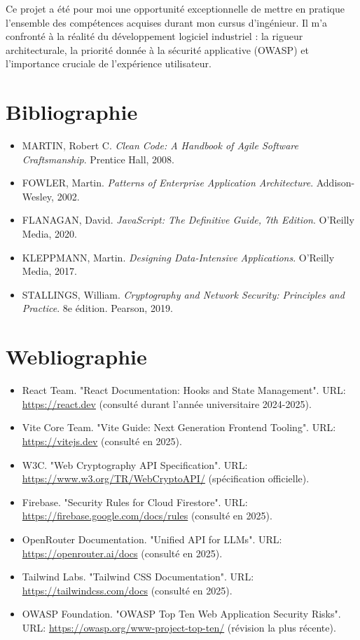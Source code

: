 ﻿\documentclass[12pt,a4paper,oneside]{report} %
\begin{document}
Ce projet a été pour moi une opportunité exceptionnelle de mettre en pratique l'ensemble des compétences acquises durant mon cursus d'ingénieur. Il m'a confronté à la réalité du développement logiciel industriel : la rigueur architecturale, la priorité donnée à la sécurité applicative (OWASP) et l'importance cruciale de l'expérience utilisateur.

\newpage
\chapter*{Bibliographie}

\begin{itemize}
    \item [1] MARTIN, Robert C. \textit{Clean Code: A Handbook of Agile Software Craftsmanship}. Prentice Hall, 2008.
    \item [2] FOWLER, Martin. \textit{Patterns of Enterprise Application Architecture}. Addison-Wesley, 2002.
    \item [3] FLANAGAN, David. \textit{JavaScript: The Definitive Guide, 7th Edition}. O'Reilly Media, 2020.
    \item [4] KLEPPMANN, Martin. \textit{Designing Data-Intensive Applications}. O'Reilly Media, 2017.
    \item [5] STALLINGS, William. \textit{Cryptography and Network Security: Principles and Practice}. 8e édition. Pearson, 2019.
\end{itemize}

\newpage
\chapter*{Webliographie}

\begin{itemize}
    \item [6] React Team. "React Documentation: Hooks and State Management". URL: \url{https://react.dev} (consulté durant l'année universitaire 2024-2025).
    \item [7] Vite Core Team. "Vite Guide: Next Generation Frontend Tooling". URL: \url{https://vitejs.dev} (consulté en 2025).
    \item [8] W3C. "Web Cryptography API Specification". URL: \url{https://www.w3.org/TR/WebCryptoAPI/} (spécification officielle).
    \item [9] Firebase. "Security Rules for Cloud Firestore". URL: \url{https://firebase.google.com/docs/rules} (consulté en 2025).
    \item [10] OpenRouter Documentation. "Unified API for LLMs". URL: \url{https://openrouter.ai/docs} (consulté en 2025).
    \item [11] Tailwind Labs. "Tailwind CSS Documentation". URL: \url{https://tailwindcss.com/docs} (consulté en 2025).
    \item [12] OWASP Foundation. "OWASP Top Ten Web Application Security Risks". URL: \url{https://owasp.org/www-project-top-ten/} (révision la plus récente).
\end{itemize}
\end{document}
